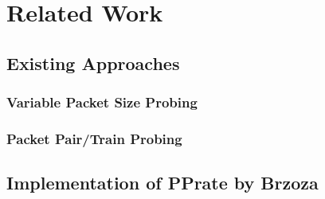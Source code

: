 \chapter{Related Work}

\section{Existing Approaches}

\subsection*{Variable Packet Size Probing}

\subsection*{Packet Pair/Train Probing}

\section{Implementation of PPrate by Brzoza}
